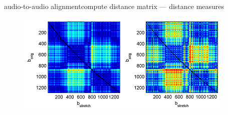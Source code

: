 \begin{frame}{audio-to-audio alignment}{compute distance matrix --- distance measures}
\begin{itemize}
{\begin{figure}
                            \centerline{\includegraphics[scale=.5]{graph/ATAA_simmatrix_compare}}
                        \end{figure}
                    }
            \end{itemize}
        \end{frame}
        
